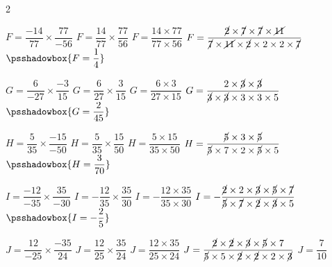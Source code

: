 \begin{corrige}
    \phantom{rrr}    
    \begin{multicols}2
        \begin{list}{}{}
            \begin{spacing}{2}
                \item $F = \dfrac{-14}{77}\times\dfrac{77}{-56}$
                $ F=\dfrac{14}{77}\times\dfrac{77}{56}$
                $ F=\dfrac{14\times77}{77\times56}$
                $ F=\dfrac{\cancel{2}\times\cancel{7}\times\cancel{7}\times\cancel{11}}{\cancel{7}\times\cancel{11}\times\cancel{2}\times2\times2\times\cancel{7}}$
                $ \psshadowbox{F=\dfrac{1}{4}}$
                \item $G = \dfrac{6}{-27}\times\dfrac{-3}{15}$
                $ G =\dfrac{6}{27}\times\dfrac{3}{15}$
                $ G =\dfrac{6\times3}{27\times15}$
                $ G =\dfrac{2\times\cancel{3}\times\cancel{3}}{\cancel{3}\times\cancel{3}\times3\times3\times5}$
                $ \psshadowbox{G =\dfrac{2}{45}}$
                \item $H = \dfrac{5}{35}\times\dfrac{-15}{-50}$
                $H =\dfrac{5}{35}\times\dfrac{15}{50}$
                $H =\dfrac{5\times15}{35\times50}$
                $H =\dfrac{\cancel{5}\times3\times\cancel{5}}{\cancel{5}\times7\times2\times\cancel{5}\times5}$
                $\psshadowbox{H =\dfrac{3}{70}}$
                \columnbreak
                \item $I=\dfrac{-12}{-35}\times\dfrac{35}{-30}$
                $I =-\dfrac{12}{35}\times\dfrac{35}{30}$
                $I =-\dfrac{12\times35}{35\times30}$
                $I =-\dfrac{\cancel{2}\times2\times\cancel{3}\times\cancel{5}\times\cancel{7}}{\cancel{5}\times\cancel{7}\times\cancel{2}\times\cancel{3}\times5}$
                $\psshadowbox{I =-\dfrac{2}{5}}$
                \item $J=\dfrac{12}{-25}\times\dfrac{-35}{24}$
                $J=\dfrac{12}{25}\times\dfrac{35}{24}$
                $J=\dfrac{12\times35}{25\times24}$
                $J=\dfrac{\cancel{2}\times\cancel{2}\times\cancel{3}\times\cancel{5}\times7}{\cancel{5}\times5\times\cancel{2}\times\cancel{2}\times2\times\cancel{3}}$
                $J=\dfrac{7}{10}$
            \end{spacing}
        \end{list}
    \end{multicols}
\end{corrige}


